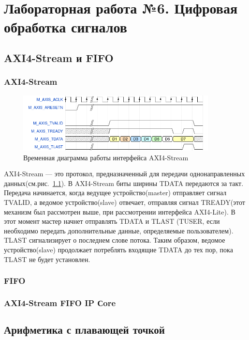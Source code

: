 \documentclass[a4paper,oneside ,14pt]{extreport}
\begin{document}
\chapter{Лабораторная работа №6. Цифровая обработка сигналов}

\section{AXI4-Stream и FIFO}

\subsection{AXI4-Stream}

\begin{figure}[h]
	\centering
	\includegraphics[width=0.9\textwidth]{image/axis_0.png}
	\caption{Временная диаграмма работы интерфейса AXI4-Stream}
	\label{axis}
\end{figure}

AXI4-Stream — это протокол, предназначенный для передачи однонаправленных данных(см.рис.~\ref{axis}). В AXI4-Stream биты ширины TDATA передаются за такт. Передача начинается, когда ведущее устройство(master) отправляет сигнал TVALID, а ведомое устройство(slave) отвечает, отправляя сигнал TREADY(этот механизм был рассмотрен выше, при рассмотрении интерфейса AXI4-Lite). В этот момент мастер начнет отправлять TDATA и TLAST (TUSER, если необходимо передать дополнительные данные, определяемые пользователем). TLAST сигнализирует о последнем слове потока. Таким образом, ведомое устройство(slave) продолжает потреблять входящие TDATA до тех пор, пока TLAST не будет установлен.

\subsection{FIFO}

\subsection{AXI4-Stream FIFO IP Сore}

\section{Арифметика с плавающей точкой}
\end{document}
